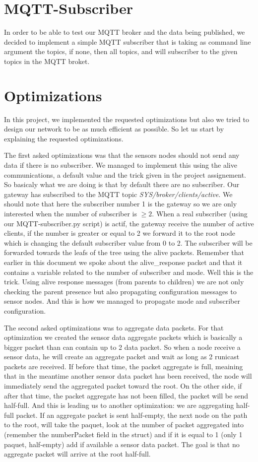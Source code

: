\documentclass[a4paper,10pt]{article}
\begin{document}
\section{MQTT-Subscriber}
\label{subscriber}
In order to be able to test our MQTT broker and the data being published, we decided to implement a simple MQTT subscriber that is taking as command line argument the topics, if none, then all topics, and will subscriber to the given topics in the MQTT broket. 


\section{Optimizations}
\label{opti}
In this project, we implemented the requested optimizations but also we tried to design our network to be as much efficient as possible.  So let us start by explaining the requested optimizations.

The first asked optimizations was that the sensors nodes should not send any data if there is no subscriber. We managed to implement this using the alive communications, a default value and the trick given in the project assignement. So basicaly what we are doing is that by default there are no subscriber. Our gateway has subscribed to the MQTT topic \emph{SYS/broker/clients/active}. We should note that here the subscriber number 1 is the gateway so we are only interested when the number of subscriber is $\geq 2$. When a real subscriber (using our MQTT-subscriber.py script) is actif, the gateway receive the number of active clients, if the number is greater or equal to 2 we forward it to the root node which is changing the default subscriber value from 0 to 2. The subscriber will be forwarded towards the leafs of the tree using the alive packets. Remember that earlier in this document we spoke about the alive\_response packet and that it contains a variable related to the number of subscriber and mode. Well this is the trick. Using alive response messages (from parents to children) we are not only checking the parent presence but also propagating configuration messages to sensor nodes. And this is how we managed to propagate mode and subscriber configuration. 

The second asked optimizations was to aggregate data packets. For that optimization we created the sensor data aggregate packets which is basically a bigger packet than can contain up to 2 data packet. So when a node receive a sensor data, he will create an aggregate packet and wait as long as 2 runicast packets are received. If before that time, the packet aggregate is full, meaining that in the meantime another sensor data packet has been received, the node will immediately send the  aggregated packet toward the root. On the other side, if after that time,  the packet aggregate has not been filled, the packet will be send half-full. And this is leading us to another optimization: we are aggregating half-full packet. If an aggregate packet is sent half-empty, the next node on the path to the root, will take the paquet, look at the number of packet aggregated into (remember the numberPacket field in the struct) and if it is equal to 1 (only 1 paquet, half-empty) add if available a sensor data packet. The goal is that no aggregate packet will arrive at the root half-full. 
\end{document}
